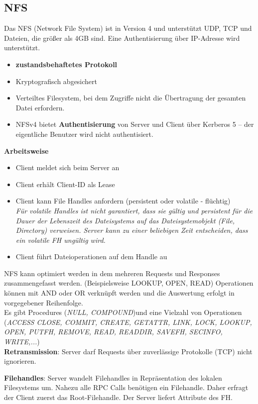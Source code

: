\documentclass{article} %
\begin{document}
\subsection{NFS}
Das NFS (Network File System) \cite{rfc3530} ist in Version 4 und unterstützt UDP, TCP und Dateien, die größer als 4GB sind. Eine Authentisierung über IP-Adresse wird unterstützt.\\
	\begin{itemize}
	\item \textbf{zustandsbehaftetes Protokoll}
	\item Kryptografisch abgesichert
	\item Verteiltes Filesystem, bei dem Zugriffe nicht die Übertragung der gesamten Datei erfordern.
	\item NFSv4 bietet \textbf{Authentisierung} von Server und Client über 
	Kerberos 5 – der eigentliche Benutzer wird nicht 
	authentisiert. 
	\end{itemize}
\textbf{Arbeitsweise}
	\begin{itemize}
	\item Client meldet sich beim Server an
	\item Client erhält Client-ID als Lease
	\item Client kann File Handles anfordern (persistent oder volatile - flüchtig)\\
	\textit{Für volatile Handles ist nicht garantiert, dass sie gültig und 	persistent für die Dauer der Lebenszeit des Dateisystems auf das Dateisystemobjekt (File, Directory) verweisen. Server kann zu einer beliebigen Zeit entscheiden, dass ein volatile FH ungültig wird. }
	\item Client führt Dateioperationen auf dem Handle au
	\end{itemize}
NFS kann optimiert werden in dem mehreren Requests und Responses zusammengefasst werden. (Beispielsweise LOOKUP, OPEN, READ) Operationen können mit AND oder OR verknüpft werden und die Auswertung erfolgt in vorgegebener Reihenfolge.\\

\noindent Es gibt Procedures (\textit{NULL, COMPOUND})und eine Vielzahl von Operationen (\textit{ACCESS CLOSE, COMMIT, CREATE, GETATTR, LINK, LOCK, LOOKUP, OPEN, PUTFH, REMOVE, READ, READDIR, SAVEFH, SECINFO, WRITE,...})\\

\noindent\textbf{Retransmission}: Server darf Requests über zuverlässige Protokolle (TCP) nicht ignorieren. 

\noindent\textbf{Filehandles}: Server wandelt Filehandles in Repräsentation des lokalen Filesystems um. Nahezu alle RPC Calls benötigen ein Filehandle. Daher erfragt der Client zuerst das Root-Filehandle. Der Server liefert Attribute des FH.\\
\end{document}
